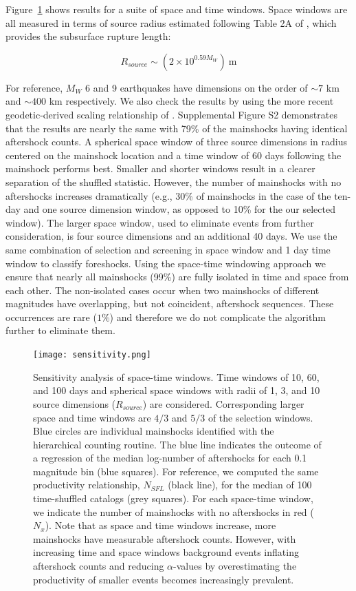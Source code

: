 \documentclass[draft, jgrga]{agujournal2018}
\begin{document}
Figure~\ref{fig:sensitivity} shows results for a suite of space and time windows. Space windows are all measured in terms of source radius estimated following Table 2A of \citet{Wells1994} , which provides the subsurface rupture length:
%
\begin{linenomath*}
\begin{equation}\label{eq:wells}
    R_{source}\sim (2\times 10^{0.59M_W})\SI{}{\meter}
\end{equation}
\end{linenomath*}
%
For reference, $M_W$ 6 and 9 earthquakes have dimensions on the order of $\sim 7$ km and $\sim 400$ km respectively. We also check the results by using the more recent geodetic-derived scaling relationship of \citet{Brengman2019EarthquakeScalingDistributions}. Supplemental Figure S2 demonstrates that the results are nearly the same with 79\% of the mainshocks having identical aftershock counts. A spherical space window of three source dimensions in radius centered on the mainshock location and a time window of 60 days following the mainshock performs best. Smaller and shorter windows result in a clearer separation of the shuffled statistic. However, the number of mainshocks with no aftershocks increases dramatically (e.g., 30\% of mainshocks in the case of the ten-day and one source dimension window, as opposed to 10\% for the our selected window). The larger space window, used to eliminate events from further consideration, is four source dimensions and an additional 40 days. We use the same combination of selection and screening in space window and 1 day time window to classify foreshocks. Using the space-time windowing approach we ensure that nearly all mainshocks (99\%) are fully isolated in time and space from each other. The non-isolated cases occur when two mainshocks of different magnitudes have overlapping, but not coincident, aftershock sequences. These occurrences are rare ($1\%$) and therefore we do not complicate the algorithm further to eliminate them.

\begin{figure}
    \centering
    \texttt{[image: sensitivity.png]}
    \caption{Sensitivity analysis of space-time windows. Time windows of 10, 60, and 100 days and spherical space windows with radii of 1, 3, and 10 source dimensions ($R_{source}$) are considered. Corresponding larger space and time windows are $4/3$ and $5/3$ of the selection windows. Blue circles are individual mainshocks identified with the hierarchical counting routine. The blue line indicates the outcome of a regression of the median log-number of aftershocks for each 0.1 magnitude bin (blue squares). For reference, we computed the same productivity relationship, $N_{SFL}$ (black line), for the median of 100 time-shuffled catalogs (grey squares). For each space-time window, we indicate the number of mainshocks with no aftershocks in red ($N_x$). Note that as space and time windows increase, more mainshocks have measurable aftershock counts. However, with increasing time and space windows background events inflating aftershock counts and reducing $\alpha$-values by overestimating the productivity of smaller events becomes increasingly prevalent.
}
    \label{fig:sensitivity}
\end{figure}
\end{document}
